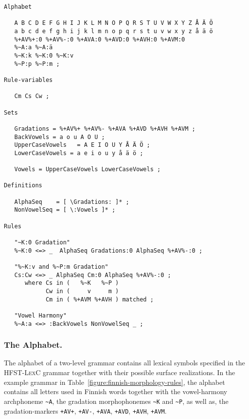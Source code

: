 \documentclass[a4paper]{article}
\begin{document}
\begin{table}[!h]
\begin{verbatim}
Alphabet

   A B C D E F G H I J K L M N O P Q R S T U V W X Y Z Å Ä Ö
   a b c d e f g h i j k l m n o p q r s t u v w x y z å ä ö
   %+AV%+:0 %+AV%-:0 %+AVA:0 %+AVD:0 %+AVH:0 %+AVM:0 
   %~A:a %~A:ä 
   %~K:k %~K:0 %~K:v 
   %~P:p %~P:m ;

Rule-variables

   Cm Cs Cw ;

Sets

   Gradations = %+AV%+ %+AV%- %+AVA %+AVD %+AVH %+AVM ; 
   BackVowels = a o u A O U ;
   UpperCaseVowels   = A E I O U Y Å Ä Ö ;
   LowerCaseVowels = a e i o u y å ä ö ;

   Vowels = UpperCaseVowels LowerCaseVowels ;

Definitions

   AlphaSeq    = [ \Gradations: ]* ;
   NonVowelSeq = [ \:Vowels ]* ;

Rules

   "~K:0 Gradation"
   %~K:0 <=> _  AlphaSeq Gradations:0 AlphaSeq %+AV%-:0 ;

   "%~K:v and %~P:m Gradation"
   Cs:Cw <=> _ AlphaSeq Cm:0 AlphaSeq %+AV%-:0 ;
      where Cs in (   %~K   %~P )
            Cw in (     v     m )
            Cm in ( %+AVM %+AVH ) matched ;

   "Vowel Harmony"
   %~A:a <=> :BackVowels NonVowelSeq _ ;

\end{verbatim}
\caption{An example \textsc{HFST-TwolC} grammar governing the surface
realizations of the forms presented in the example lexicon in
Table~\ref{fig:finnish-lexc}.}\label{figure:finnish-morphology-rules}
\end{table}

\subsubsection{The Alphabet.}

The alphabet of a two-level grammar contains all lexical symbols
specified in the \textsc{HFST-LexC} grammar together with their
possible surface realizations. In the example grammar in
Table~\ref{figure:finnish-morphology-rules}, the alphabet contains all
letters used in Finnish words together with the vowel-harmony
archphoneme \verb|~A|, the gradation morphophonemes \verb|~K| and
\verb|~P|, as well as, the gradation-markers \verb|+AV+|, \verb|+AV-|,
\verb|+AVA|, \verb|+AVD|, \verb|+AVH|, \verb|+AVM|.
\end{document}
